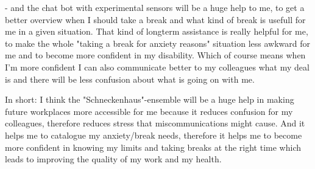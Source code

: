 - and the chat bot with experimental sensors will be a huge help to me, to get a better overview when I should take a break and what kind of break is usefull for me in a given situation. That kind of longterm assistance is really helpful for me, to make the whole "taking a break for anxiety reasons" situation less awkward for me and to become more confident in my disability. Which of course means when I'm more confident I can also communicate better to my colleagues what my deal is and there will be less confusion about what is going on with me.

In short: I think the "Schneckenhaus"-ensemble will be a huge help in making future workplaces more accessible for me because it reduces confusion for my colleagues, therefore reduces stress that miscommunications might cause. And it helps me to catalogue my anxiety/break needs, therefore it helps me to become more confident in knowing my limits and taking breaks at the right time which leads to improving the quality of my work and my health.
